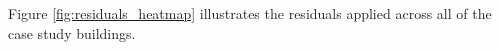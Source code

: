 Figure \ref{fig:residuals_heatmap} illustrates the residuals applied across all of the case study buildings.